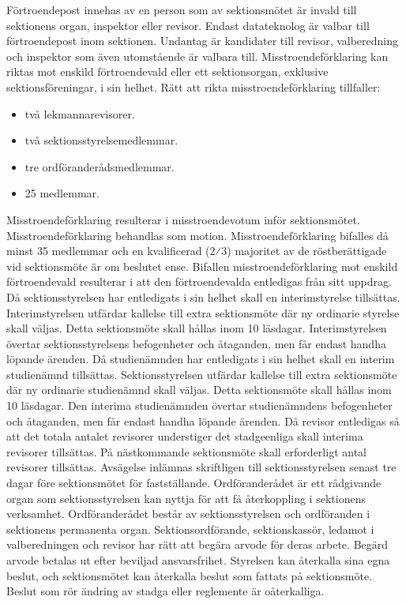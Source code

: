 \documentclass[a4paper]{dteklag}
\begin{document}
\para[Förtroendepost] Förtroendepost innehas av en person som av sektionsmötet är invald till sektionens organ, inspektor eller revisor.
\para Endast datateknolog är valbar till förtroendepost inom sektionen. 
\stycke Undantag är kandidater till revisor, valberedning och inspektor som även utomstående är valbara till.
\para[Misstroendeförklaring] Misstroendeförklaring kan riktas mot enskild förtroendevald eller ett sektionsorgan, exklusive sektionsföreningar, i sin helhet.
\para Rätt att rikta misstroendeförklaring tillfaller:
\begin{itemize}
  \item två lekmannarevisorer.
  \item två sektionsstyrelsemedlemmar.
  \item tre ordföranderådsmedlemmar.
  \item 25 medlemmar.
\end{itemize}
\para Misstroendeförklaring resulterar i misstroendevotum inför sektionsmötet. Misstroendeförklaring behandlas som motion.
\para Misstroendeförklaring bifalles då minst 35 medlemmar och en kvalificerad (2⁄3) majoritet av de röstberättigade vid sektionsmöte är om beslutet ense.
\para Bifallen misstroendeförklaring mot enskild förtroendevald resulterar i att den förtroendevalda entledigas från sitt uppdrag.
\para Då sektionsstyrelsen har entledigats i sin helhet skall en interimstyrelse tillsättas. Interimstyrelsen utfärdar kallelse till extra sektionsmöte där ny ordinarie styrelse skall väljas. Detta sektionsmöte skall hållas inom 10 läsdagar. Interimstyrelsen övertar sektionsstyrelsens befogenheter och åtaganden, men får endast handha löpande ärenden.
\para Då studienämnden har entledigats i sin helhet skall en interim studienämnd tillsättas. Sektionsstyrelsen utfärdar kallelse till extra sektionsmöte där ny ordinarie studienämnd skall väljas. Detta sektionsmöte skall hållas inom 10 läsdagar. Den interima studienämnden övertar studienämndens befogenheter och åtaganden, men får endast handha löpande ärenden.
\para Då revisor entledigas så att det totala antalet revisorer understiger det stadgeenliga skall interima revisorer tillsättas. På nästkommande sektionsmöte skall erforderligt antal revisorer tillsättas.
\para[Avsägelse] Avsägelse inlämnas skriftligen till sektionsstyrelsen senast tre dagar före sektionsmötet för fastställande.
\para[Ordföranderåd] Ordföranderådet är ett rådgivande organ som sektionsstyrelsen kan nyttja för att få återkoppling i sektionens verksamhet.
\para Ordföranderådet består av sektionsstyrelsen och ordföranden i sektionens permanenta organ.
\para[Arvode] Sektionsordförande, sektionskassör, ledamot i valberedningen och revisor har rätt att begära arvode för deras arbete.
\para Begärd arvode betalas ut efter beviljad ansvarsfrihet.
\para[Beslutsåterkallelse] Styrelsen kan återkalla sina egna beslut, och sektionsmötet kan återkalla beslut som fattats på sektionsmöte. 
\stycke Beslut som rör ändring av stadga eller reglemente är oåterkalliga.
\end{document}
